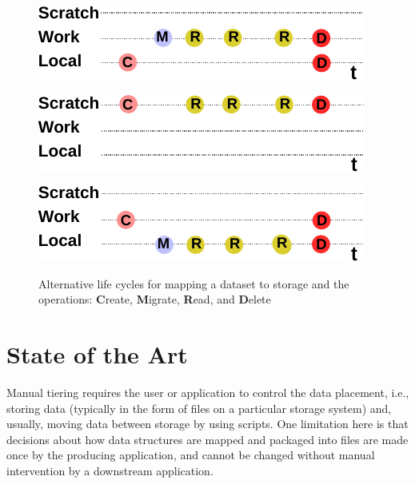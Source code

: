 \documentclass{superfri}
\begin{document}
\begin{figure}[b]
    \begin{minipage}{.33\linewidth}
        \centering
        \includegraphics[width=0.9\columnwidth]{pic/lifecycle-1}
        \label{fig:lifecycle1}
    \end{minipage}
    \begin{minipage}{.33\linewidth}
        \centering
        \includegraphics[width=0.9\columnwidth]{pic/lifecycle-2}
        \label{fig:lifecycle2}
    \end{minipage}
    \begin{minipage}{.33\linewidth}
        \centering
        \includegraphics[width=0.9\columnwidth]{pic/lifecycle-3}
        \label{fig:lifecycle3}
    \end{minipage}
    \vspace{5pt}
    \caption{Alternative life cycles for mapping a dataset to storage and the operations: \textbf{C}reate, \textbf{M}igrate, \textbf{R}ead, and \textbf{D}elete}
    \label{fig:lifecycle}
\end{figure}

\section{State of the Art}

Manual tiering requires the user or application to control the data placement, i.e., storing data (typically in the form of files on a particular storage system) and, usually, moving data between storage by using scripts.
One limitation here is that decisions about how data structures are mapped and packaged into files are made once by the producing application, and cannot be changed without manual intervention by a downstream application.
\end{document}
